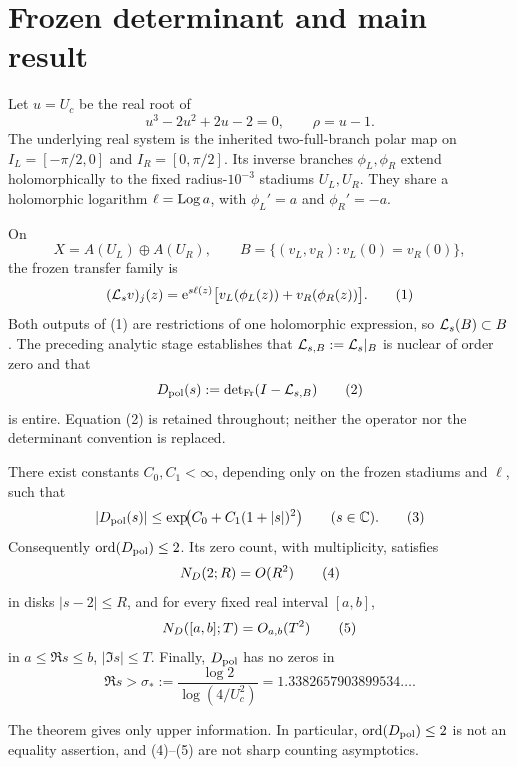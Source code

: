 \section{Frozen determinant and main result}
Let \(u=U_c\) be the real root of
\[
 u^3-2u^2+2u-2=0,
 \qquad \rho=u-1.
\]
The underlying real system is the inherited two-full-branch polar map on
\(I_L=[-\pi/2,0]\) and \(I_R=[0,\pi/2]\). Its inverse branches
\(\phi_L,\phi_R\) extend holomorphically to the fixed radius-\(10^{-3}\)
stadiums \(U_L,U_R\). They share a holomorphic logarithm
\(\ell=\operatorname{Log} a\), with \(\phi_L'=a\) and \(\phi_R'=-a\).

On
\[
 X=A(U_L)\oplus A(U_R),
 \qquad
 B=\{(v_L,v_R):v_L(0)=v_R(0)\},
\]
the frozen transfer family is
\[
 (\mathcal{L}_s v)_j(z)=\mathrm{e}^{s\ell(z)}
 \bigl[v_L(\phi_L(z))+v_R(\phi_R(z))\bigr].
 \tag{1}
\]
Both outputs of (1) are restrictions of one holomorphic expression, so
\(\mathcal{L}_s(B)\subset B\). The preceding analytic stage establishes that
\(\mathcal{L}_{s,B}:=\mathcal{L}_s|_B\) is nuclear of order zero and that
\[
 D_{\mathrm{pol}}(s):=\operatorname{det}_{\mathrm{Fr}}(I-\mathcal{L}_{s,B})
 \tag{2}
\]
is entire. Equation (2) is retained throughout; neither the operator nor the
determinant convention is replaced.

\begin{theorem}
There exist constants \(C_0,C_1<\infty\), depending only on the frozen
stadiums and \(\ell\), such that
\[
 |D_{\mathrm{pol}}(s)|\le
 \exp\!\bigl(C_0+C_1(1+|s|)^2\bigr)
 \qquad(s\in\mathbb{C}).
 \tag{3}
\]
Consequently \(\operatorname{ord}(D_{\mathrm{pol}})\le2\). Its zero count, with multiplicity,
satisfies
\[
 N_D(2;R)=O(R^2)
 \tag{4}
\]
in disks \(|s-2|\le R\), and for every fixed real interval \([a,b]\),
\[
 N_D([a,b];T)=O_{a,b}(T^2)
 \tag{5}
\]
in \(a\le\Re s\le b\), \(|\Im s|\le T\). Finally, \(D_{\mathrm{pol}}\) has no
zeros in
\[
\Re s>\sigma_*:=\frac{\log2}{\log(4/U_c^2)}
 =1.3382657903899534\ldots.
 \tag{6}
\]
\end{theorem}

The theorem gives only upper information. In particular,
\(\operatorname{ord}(D_{\mathrm{pol}})\le2\) is not an equality assertion, and (4)--(5) are not
sharp counting asymptotics.
